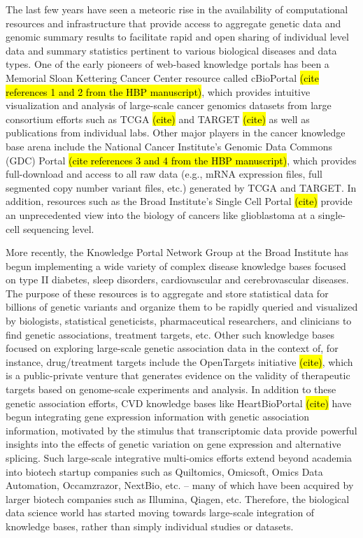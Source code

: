 \documentclass[letter]{bioinfo}
\begin{document}
The last few years have seen a meteoric rise in the availability of computational resources and infrastructure that provide access to aggregate genetic data and genomic summary results to facilitate rapid and open sharing of individual level data and summary statistics pertinent to various biological diseases and data types.  One of the early pioneers of web-based knowledge portals has been a Memorial Sloan Kettering Cancer Center resource called cBioPortal \hl{(cite references 1 and 2 from the HBP manuscript)}, which provides intuitive visualization and analysis of large-scale cancer genomics datasets from large consortium efforts such as TCGA \hl{(cite)} and TARGET \hl{(cite)} as well as publications from individual labs.  Other major players in the cancer knowledge base arena include the National Cancer Institute's Genomic Data Commons (GDC) Portal \hl{(cite references 3 and 4 from the HBP manuscript)}, which provides full-download and access to all raw data (e.g., mRNA expression files, full segmented copy number variant files, etc.) generated by TCGA and TARGET.  In addition, resources such as the Broad Institute's Single Cell Portal \hl{(cite)} provide an unprecedented view into the biology of cancers like glioblastoma at a single-cell sequencing level.    

More recently, the Knowledge Portal Network Group at the Broad Institute has begun implementing a wide variety of complex disease knowledge bases focused on type II diabetes, sleep disorders, cardiovascular and cerebrovascular diseases.  The purpose of these resources is to aggregate and store statistical data for billions of genetic variants and organize them to be rapidly queried and visualized by biologists, statistical geneticists, pharmaceutical researchers, and clinicians to find genetic associations, treatment targets, etc.  Other such knowledge bases focused on exploring large-scale genetic association data in the context of, for instance, drug/treatment targets include the OpenTargets initiative \hl{(cite)}, which is a public-private venture that generates evidence on the validity of therapeutic targets based on genome-scale experiments and analysis.  In addition to these genetic association efforts, CVD knowledge bases like HeartBioPortal \hl{(cite)} have begun integrating gene expression information with genetic association information, motivated by the stimulus that transcriptomic data provide powerful insights into the effects of genetic variation on gene expression and alternative splicing.  Such large-scale integrative multi-omics efforts extend beyond academia into biotech startup companies such as Quiltomics, Omicsoft, Omics Data Automation, Occamzrazor, NextBio, etc. -- many of which have been acquired by larger biotech companies such as Illumina, Qiagen, etc.  Therefore, the biological data science world has started moving towards large-scale integration of knowledge bases, rather than simply individual studies or datasets.    
\end{document}

